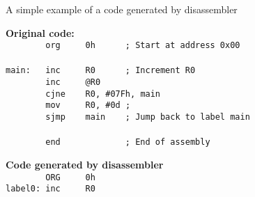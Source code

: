 \documentclass[a4paper,twoside,12pt]{book}
\newcommand{\mysmallfont}{\fontsize{8pt}{10pt} \selectfont{}}
\begin{document}
	\bigskip
	\noindent
	\begin{center}
		\small{A simple example of a code generated by disassembler}
	\end{center}
	\begin{minipage}{\textwidth}
		\twocolumn
		\begin{minipage}[t]{.6\textwidth}
			\mysmallfont{}
			\textbf{Original code:}\\
			\verb'        '{\color{highlight_directive}\verb'org'}\verb'     '{\color{highlight_hex}\verb'0h'}\verb'      '{\color{highlight_comment}\verb'; Start at address 0x00'}\\
			\verb''\\
			{\color{highlight_label}\verb'main:'}\verb'   '{\color{highlight_instruction}\verb'inc'}\verb'     '{\color{highlight_sfr}\verb'R0'}\verb'      '{\color{highlight_comment}\verb'; Increment R0'}\\
			\verb'        '{\color{highlight_instruction}\verb'inc'}\verb'     '{\color{highlight_indirect}\verb'@R0'}\\
			\verb'        '{\color{highlight_instruction}\verb'cjne'}\verb'    '{\color{highlight_sfr}\verb'R0'}{\color{highlight_oper_sep}\verb','}\verb' '{\color{highlight_imm_hex}\verb'#07Fh'}{\color{highlight_oper_sep}\verb','}\verb' '{\color{highlight_constant}\verb'main'}\\
			\verb'        '{\color{highlight_instruction}\verb'mov'}\verb'     '{\color{highlight_sfr}\verb'R0'}{\color{highlight_oper_sep}\verb','}\verb' '{\color{highlight_imm_dec}\verb'#0d'}\verb' '{\color{highlight_comment}\verb';'}\\
			\verb'        '{\color{highlight_instruction}\verb'sjmp'}\verb'    '{\color{highlight_constant}\verb'main'}\verb'    '{\color{highlight_comment}\verb'; Jump back to label main'}\\
			\verb''\\
			\verb'        '{\color{highlight_directive}\verb'end'}\verb'             '{\color{highlight_comment}\verb'; End of assembly'}\\
		\end{minipage}\begin{minipage}[t]{.4\textwidth}
			\mysmallfont{}
			\textbf{Code generated by disassembler}\\
			\verb'        '{\color{highlight_directive}\verb'ORG'}\verb'     '{\color{highlight_hex}\verb'0h'}\\
			{\color{highlight_label}\verb'label0:'}\verb' '{\color{highlight_instruction}\verb'inc'}\verb'     '{\color{highlight_sfr}\verb'R0'}\\

\end{minipage}
\end{minipage}
\end{document}
